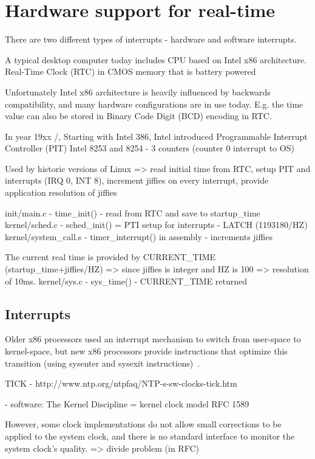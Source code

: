 
\chapter{Hardware support for real-time}

There are two different types of interrupts - hardware and software interrupts.

A typical desktop computer today includes CPU based on Intel x86 architecture.
Real-Time Clock (RTC) in CMOS memory that is battery powered

Unfortunately Intel x86 architecture is heavily influenced by backwards compatibility,
and many hardware configurations are in use today.
E.g. the time value can also be stored in Binary Code Digit (BCD) encoding in RTC.

In year 19xx /, Starting with Intel 386,
Intel introduced
Programmable Interrupt Controller (PIT) Intel 8253 and 8254 - 3 counters (counter 0 interrupt to OS)


Used by historic versions of Linux
=> read initial time from RTC, setup PIT and interrupts (IRQ 0, INT 8), increment jiffies on every interrupt, provide application resolution of jiffies

init/main.c - time\_init() - read from RTC and save to startup\_time
kernel/sched.c - sched\_init() = PTI setup for interrupts - LATCH (1193180/HZ)
kernel/system\_call.s - timer\_interrupt() in assembly - increments jiffies

The current real time is provided by CURRENT\_TIME (startup\_time+jiffies/HZ) => since jiffies is integer and HZ is 100 => resolution of 10ms.
kernel/sys.c - sys\_time() - CURRENT\_TIME returned


\section{Interrupts}
Older x86 processors used an interrupt mechanism to switch from
user-space to kernel-space, but new x86 processors provide instructions
that optimize this transition (using sysenter and sysexit instructions)~\cite{ibm-linux-system-calls}.


TICK - http://www.ntp.org/ntpfaq/NTP-s-sw-clocks-tick.htm


- software:
The Kernel Discipline =  kernel clock model RFC 1589

However, some clock implementations do not allow small corrections to be applied to the system clock, and there is no standard interface to monitor the system clock's quality.
=> divide problem (in RFC)
